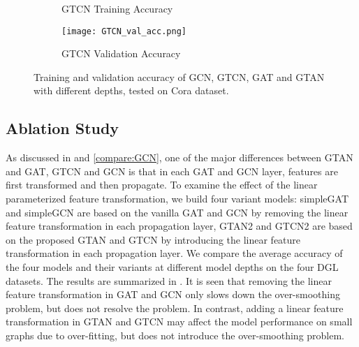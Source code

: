 \documentclass[lettersize,journal]{IEEEtran}
\theoremstyle{plain}
\theoremstyle{definition}
\theoremstyle{remark}
\begin{document}
\begin{figure}[ht]
\begin{subfigure}[b]{0.235\textwidth}
\begin{center}
			\caption{GTCN Training Accuracy}
			\label{fig:GTCN_train}
		\end{center}
	\end{subfigure}
	\begin{subfigure}[b]{0.235\textwidth}
		\begin{center}
			\texttt{[image: GTCN\_val\_acc.png]}
			\caption{GTCN Validation Accuracy}
			\label{fig:GTCN_val}
		\end{center}
	\end{subfigure}
	\caption{Training and validation accuracy of GCN, GTCN, GAT and GTAN with different depths, tested on Cora dataset.}
	\label{fig:smooth}
\end{figure}


\subsection{Ablation Study}
\label{ablation}
As discussed in  and \ref{compare:GCN}, one of the major differences between GTAN and GAT, GTCN and GCN is that in each GAT and GCN layer, features are first transformed and then propagate. To examine the effect of the linear parameterized feature transformation, we build four variant models: simpleGAT and simpleGCN are based on the vanilla GAT and GCN by removing the linear feature transformation in each propagation layer, GTAN2 and GTCN2 are based on the proposed GTAN and GTCN by introducing the linear feature transformation in each propagation layer. We compare the average accuracy of the four models and their variants at different model depths on the four DGL datasets. The results are summarized in . It is seen that removing the linear feature transformation in GAT and GCN only slows down the over-smoothing problem, but does not resolve the problem. In contrast, adding a linear feature transformation in GTAN and GTCN may affect the model performance on small graphs due to over-fitting, but does not introduce the over-smoothing problem.
\end{document}

